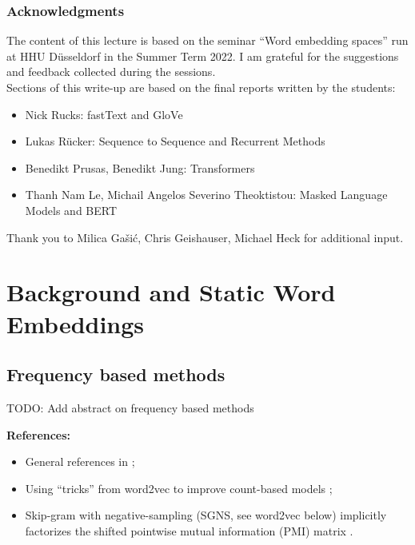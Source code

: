 \documentclass[11pt, a4paper]{amsart}
\begin{document}
\subsubsection{Acknowledgments}

The content of this lecture is based on the seminar ``Word embedding spaces'' run at HHU Düsseldorf in the Summer Term 2022.
I am grateful for the suggestions and feedback collected during the sessions. \\
Sections of this write-up are based on the final reports written by the students:
\begin{itemize}
	\item Nick Rucks: fastText and GloVe
	\item Lukas Rücker: Sequence to Sequence and Recurrent Methods
	\item Benedikt Prusas, Benedikt Jung: Transformers
	\item Thanh Nam Le, Michail Angelos Severino Theoktistou: Masked Language Models and BERT
\end{itemize}

\noindent Thank you to Milica Gašić, Chris Geishauser, Michael Heck for additional input. \\


\section{Background and Static Word Embeddings}
\label{sec:static_word_embeddings}


\subsection{Frequency based methods}

TODO: Add abstract on frequency based methods

\noindent \textbf{References:}
\begin{itemize}
    \item General references in ;
    \item Using ``tricks'' from word2vec to improve count-based models \cite{levy-etal-2015-improving};
    \item Skip-gram with negative-sampling (SGNS, see word2vec below) implicitly factorizes the shifted pointwise mutual information (PMI) matrix \cite{NIPS2014_feab05aa}.
\end{itemize}
\end{document}
